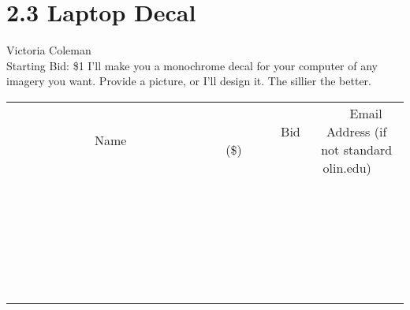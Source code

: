 \documentclass[11pt]{article}
\begin{document}
\section*{2.3 Laptop Decal}
Victoria Coleman
\\
Starting Bid: \$1
\newline
I'll make you a monochrome decal for your computer of any imagery you want. Provide a picture, or I'll design it. The sillier the better.
\\[6ex]
\begin{tabular}{c c c}
~~~~~~~~~~~~~Name~~~~~~~~~~~~~ & ~~~~~~~~~Bid (\$)~~~~~~~~~  & ~~~Email Address (if not standard olin.edu)~~~\\
 & & \\
\hline
 & & \\
\hline
 & & \\
\hline
 & & \\
\hline
 & & \\
\hline
 & & \\
\hline
 & & \\
\hline
 & & \\
\hline
 & & \\
\hline
 & & \\
\hline
 & & \\
\hline
 & & \\
\hline
 & & \\
\hline
 & & \\
\hline
 & & \\
\hline
 & & \\
\hline
 & & \\
\hline
 & & \\
\hline
 & & \\
\hline
 & & \\
\hline
 & & \\
\hline
 & & \\
\hline
 & & \\
\hline
 & & \\
\hline
 & & \\
\hline
 & & \\
\hline
\end{tabular}
\newpage
\end{document}
